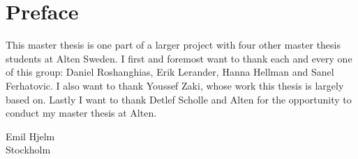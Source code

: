 \chapter*{Preface}
This master thesis is one part of a larger project with four other master thesis students at Alten Sweden. I first and foremost want to thank each and every one of this group: Daniel Roshanghias, Erik Lerander, Hanna Hellman and Sanel Ferhatovic. I also want to thank Youssef Zaki, whose work this thesis is largely based on. Lastly I want to thank Detlef Scholle and Alten for the opportunity to conduct my master thesis at Alten.


\begin{flushright}Emil Hjelm \\ Stockholm \end{flushright}
